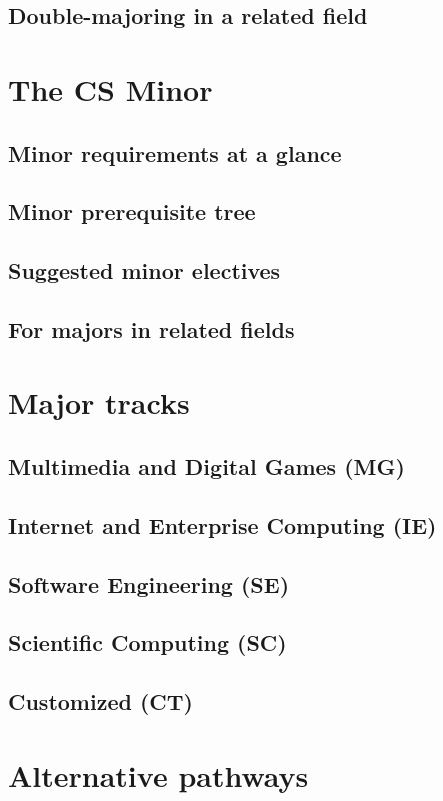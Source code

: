 \documentclass{book}
\begin{document}
\section{Double-majoring in a related field}

\chapter{The CS Minor}

\section{Minor requirements at a glance}
\section{Minor prerequisite tree}
\section{Suggested minor electives}
\section{For majors in related fields}

\chapter{Major tracks}

\section{Multimedia and Digital Games (MG)}
\section{Internet and Enterprise Computing (IE)}
\section{Software Engineering (SE)}
\section{Scientific Computing (SC)}
\section{Customized (CT)}

\chapter{Alternative pathways}
\end{document}
